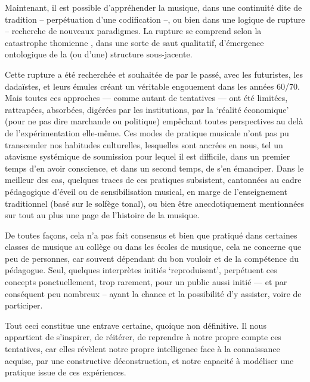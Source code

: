 \documentclass{article}
\newcommand{\footref}[1]{%
  \enotezwritemark{\enmarkstyle\ref{#1}}%
}
\begin{document}
Maintenant, il est possible d'appréhender la musique, dans une continuité dite de tradition -- perpétuation d'une codification --, ou bien dans une logique de rupture -- recherche de nouveaux paradigmes. La rupture se comprend selon la catastrophe thomienne\footref{efn:thom}, dans une sorte de saut qualitatif, d’émergence ontologique de la (ou d’une) structure sous-jacente. 

Cette rupture a été recherchée et souhaitée de par le passé, avec les futuristes, les dadaïstes, et leurs émules créant un véritable engouement dans les années 60/70. Mais toutes ces approches — comme autant de tentatives — ont été limitées, rattrapées, absorbées, digérées par les institutions, par la `réalité économique’ (pour ne pas dire marchande ou politique) empêchant toutes perspectives au delà de l’expérimentation elle-même. Ces modes de pratique musicale n’ont pas pu transcender nos habitudes culturelles, lesquelles sont ancrées en nous, tel un atavisme systémique de soumission pour lequel il est difficile, dans un premier temps d'en avoir conscience, et dans un second temps, de s'en émanciper.
Dans le meilleur des cas, quelques traces de ces pratiques subsistent, cantonnées au cadre pédagogique d’éveil ou de sensibilisation musical, en marge de l'enseignement traditionnel (basé sur le solfège tonal), ou bien être anecdotiquement mentionnées sur tout au plus une page de l’histoire de la musique.

De toutes façons, cela n’a pas fait consensus et bien que pratiqué dans certaines classes de musique au collège ou dans les écoles de musique, cela ne concerne que peu de personnes, car souvent dépendant du bon vouloir et de la compétence du pédagogue. Seul, quelques interprètes initiés `reproduisent’, perpétuent  ces concepts ponctuellement, trop rarement, pour un public aussi initié — et par conséquent peu nombreux -- ayant la chance et la possibilité d’y assister, voire de participer.

Tout ceci constitue une entrave certaine, quoique non définitive. Il nous appartient de s’inspirer, de réitérer, de reprendre à notre propre compte ces tentatives, car elles révèlent notre propre intelligence face à la connaissance acquise, par une constructive déconstruction, et notre capacité à modéliser une pratique issue de ces expériences.
\end{document}
